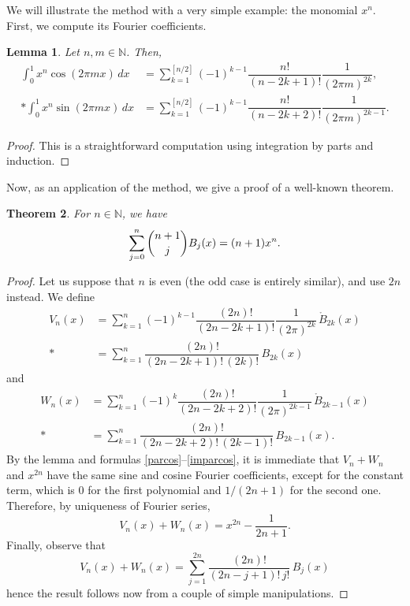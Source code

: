 \documentclass[a4paper,reqno]{amsart}
\newcommand{\N}{\mathbb{N}}
\theoremstyle{plain}
\newtheorem{Teor}{Theorem}[section]
\newtheorem{Lema}[Teor]{Lemma}
\numberwithin{equation}{section}
\theoremstyle{remark}
\begin{document}
We will illustrate the method with a very simple example: the monomial $x^n$. First, we compute its Fourier coefficients.


\begin{Lema} 
\label{Lema:xn}
Let $n, m \in\N$. Then,
\begin{align*}
  \int_0^1 x^{n} \cos(2\pi mx)\,dx 
  &= \sum_{k=1}^{[n/2]}(-1)^{k-1} \dfrac{n!}{(n-2k+1)!} \dfrac{1}{(2\pi m)^{2k}},
  \\*
  \int_0^1 x^{n} \sin(2\pi mx)\,dx 
  &= \sum_{k=1}^{[n/2]}(-1)^{k-1} \dfrac{n!}{(n-2k+2)!} \dfrac{1}{(2\pi m)^{2k-1}}.
\end{align*}
\end{Lema}

\begin{proof} 
This is a straightforward computation using integration by parts and induction.
\end{proof}

Now, as an application of the method, we give a proof of a well-known theorem.

\begin{Teor} 
For $n\in\N$, we have
\[
  \sum_{j=0}^n \dbinom{n+1}{j} B_j(x) = (n+1) x^n.
\]
\end{Teor}

\begin{proof}
Let us suppose that $n$ is even (the odd case is entirely similar), and use $2n$ instead. We define
\begin{align*}
  V_n(x) &= \sum_{k=1}^n (-1)^{k-1} \dfrac{(2n)!}{(2n-2k+1)!} \dfrac{1}{(2\pi)^{2k}}\, \mathring{B}_{2k}(x)
  \\*
  &= \sum_{k=1}^n \dfrac{(2n)!}{(2n-2k+1)!\,(2k)!}\,B_{2k}(x)
\end{align*}
and
\begin{align*}
  W_n(x) &= \sum_{k=1}^n (-1)^{k} \dfrac{(2n)!}{(2n-2k+2)!} \dfrac{1}{(2\pi)^{2k-1}}\,\mathring{B}_{2k-1}(x)
  \\*
  &= \sum_{k=1}^n \dfrac{(2n)!}{(2n-2k+2)!\,(2k-1)!}\,B_{2k-1}(x).
\end{align*}
By the lemma and formulas \eqref{parcos}--\eqref{imparcos}, it is immediate that $V_n+W_n$ and $x^{2n}$ have the same sine and cosine Fourier coefficients, except for the constant term, which is $0$ for the first polynomial and $1/(2n+1)$ for the second one. Therefore, by uniqueness of Fourier series,
\[
  V_n(x)+W_n(x) = x^{2n}-\dfrac{1}{2n+1}.
\]
Finally, observe that
\[
  V_n(x)+W_n(x) = \sum_{j=1}^{2n} \dfrac{(2n)!}{(2n-j+1)!\,j!}\,B_{j}(x)
\]
hence the result follows now from a couple of simple manipulations.
\end{proof}
\end{document}

